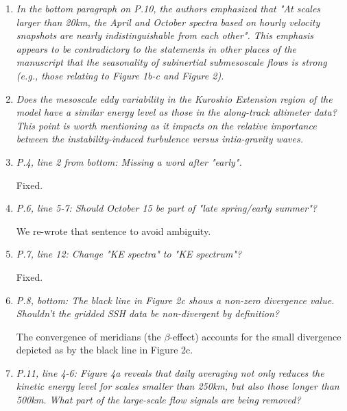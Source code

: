 \documentclass[11pt]{article}
\begin{document}
\begin{enumerate}


\item {\it In the bottom paragraph on P.10, the authors emphasized that "At scales larger
than 20km, the April and October spectra based on hourly velocity snapshots are
nearly indistinguishable from each other". This emphasis appears to be contradictory
to the statements in other places of the manuscript that the seasonality of subinertial
submesoscale flows is strong (e.g., those relating to Figure 1b-c and Figure 2).}

\item {\it Does the mesoscale eddy variability in the Kuroshio Extension region of the model
have a similar energy level as those in the along-track altimeter data? This point
is worth mentioning as it impacts on the relative importance between the instability-induced
turbulence versus intia-gravity waves.}

\item {\it P.4, line 2 from bottom: Missing a word after "early".}

  Fixed.

\item {\it P.6, line 5-7: Should October 15 be part of "late spring/early summer"?}

  We re-wrote that sentence to avoid ambiguity.

\item {\it P.7, line 12: Change "KE spectra" to "KE spectrum"?}

Fixed.

\item {\it P.8, bottom: The black line in Figure 2c shows a non-zero divergence value.
      Shouldn't the gridded SSH data be non-divergent by definition?}

  The convergence of meridians (the $\beta$-effect) accounts for the
  small divergence depicted as by the black line in Figure 2c.

\item {\it P.11, line 4-6: Figure 4a reveals that daily averaging not only reduces the
      kinetic energy level for scales smaller than 250km, but also those longer
      than 500km. What part of the large-scale flow signals are being removed?}

\end{enumerate}

%
%
\end{document}
